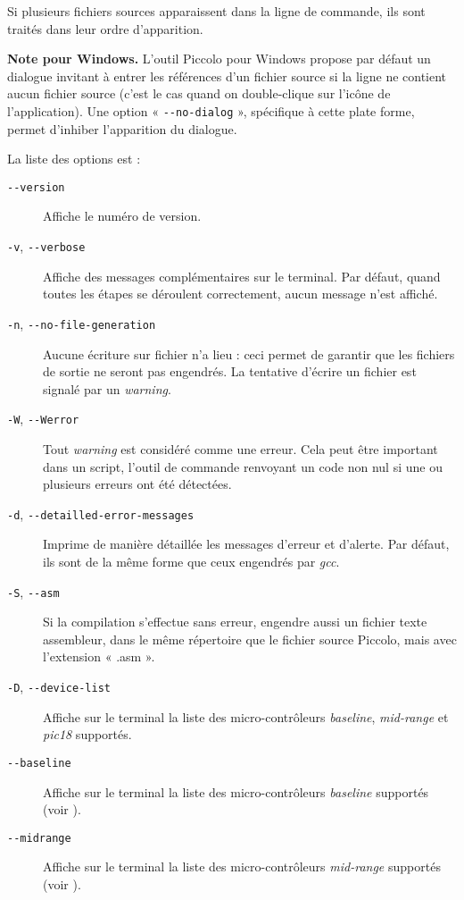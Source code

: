 Si plusieurs fichiers sources apparaissent dans la ligne de commande, ils sont traités dans leur ordre d’apparition.

{\bf Note pour Windows.} L’outil Piccolo pour Windows propose par défaut un dialogue invitant à entrer les références d’un fichier source si la ligne ne contient aucun fichier source (c’est le cas quand on double-clique sur l’icône de l’application). Une option « \texttt{-{-}no-dialog} », spécifique à cette plate forme, permet d'inhiber l’apparition du dialogue.

La liste des options est :
\begin{description}
  \item[\texttt{-{-}version}] Affiche le numéro de version.
  \item[\texttt{-v}, \texttt{-{-}verbose}] Affiche des messages complémentaires sur le terminal. Par défaut, quand toutes les étapes se déroulent correctement, aucun message n’est affiché.
  \item[\texttt{-n}, \texttt{-{-}no-file-generation}] Aucune écriture sur fichier n’a lieu : ceci permet de garantir que les fichiers de sortie ne seront pas engendrés. La tentative d’écrire un fichier est signalé par un \emph{warning}.
  \item[\texttt{-W}, \texttt{-{-}Werror}] Tout \emph{warning} est considéré comme une erreur. Cela peut être important dans un script, l’outil de commande renvoyant un code non nul si une ou plusieurs erreurs ont été détectées.
  \item[\texttt{-d}, \texttt{-{-}detailled-error-messages}] Imprime de manière détaillée les messages d’erreur et d’alerte. Par défaut, ils sont de la même forme que ceux engendrés par \emph{gcc}.
  \item[\texttt{-S}, \texttt{-{-}asm}] Si la compilation s’effectue sans erreur, engendre aussi un fichier texte assembleur, dans le même répertoire que le fichier source Piccolo, mais avec l’extension « .asm ».
  \item[\texttt{-D}, \texttt{-{-}device-list}] Affiche sur le terminal la liste des micro-contrôleurs \emph{baseline}, \emph{mid-range} et \emph{pic18} supportés.
  \item[\texttt{-{-}baseline}] Affiche sur le terminal la liste des micro-contrôleurs \emph{baseline} supportés (voir ).
  \item[\texttt{-{-}midrange}] Affiche sur le terminal la liste des micro-contrôleurs \emph{mid-range} supportés (voir ).

\end{description}

